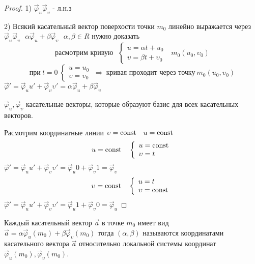 \begin{proof}
  1) $\vec \varphi_u \vec \varphi_{\upsilon}$ - л.н.з

  2) Всякий касательный вектор поверхости точки $m_0$ линейно выражается через
  $\vec \varphi_u \vec \varphi_{\upsilon} ~~~ \alpha \vec \varphi_u +\beta
  \vec \varphi_{\upsilon} ~~~ \alpha, \beta \in R$ нужно доказать
  $$
  \text{расмотрим кривую} ~~~
  \left\{
    \begin{array}{l}
      u = \alpha t + u_0 \\
      \upsilon = \beta t + \upsilon_0
    \end{array}
  \right. ~~~ m_0 (u_0, \upsilon_0)
  $$
  $$
  \text{при} ~ t = 0 ~
  \left\{
    \begin{array}{l}
      u = u_0 \\
      \upsilon = \upsilon_0
    \end{array}
  \right. ~ \Rightarrow ~ \text{кривая проходит через точку} ~
  m_0 (u_0, \upsilon_0)
  $$
  $\vec \varphi' = \vec \varphi_u u' + \vec \varphi_{\upsilon}
  \upsilon' = \alpha \vec \varphi_u + \beta \vec \varphi_{\upsilon}$

  $\vec \varphi_u, \vec \varphi_{\upsilon}$ касательные векторы, которые
  образуют базис для всех касательных векторов.

  Расмотрим координатные линии $\upsilon = \mathrm{const} ~~~ u = \mathrm{const}$
  $$
  u = \mathrm{const} ~~~
  \left\{
    \begin{array}{l}
      u = \mathrm{const} \\
      \upsilon = t
    \end{array}
  \right.
  $$
  $\vec \varphi' = \vec \varphi_u u' + \vec \varphi_{\upsilon}
  \upsilon' = \vec \varphi_u 0 + \vec \varphi_{\upsilon} 1 =
  \vec \varphi_{\upsilon}$
  $$
  \upsilon = \mathrm{const} ~~~
  \left\{
    \begin{array}{l}
      u = t \\
      \upsilon = \mathrm{const}
    \end{array}
  \right.
  $$
  $\vec \varphi' = \vec \varphi_u u' + \vec \varphi_{\upsilon}
  \upsilon' = \vec \varphi_u 1 + \vec \varphi_{\upsilon} 0 = \vec \varphi_u$
\end{proof}

\begin{define}
  Каждый касательный вектор $\vec a$ в точке $m_0$ имеет вид $\vec a =
  \alpha \vec \varphi_u(m_0) + \beta \vec \varphi_{\upsilon}(m_0)$ тогда
  $(\alpha, \beta)$ называются
  координатами касательного вектора $\vec a$ относительно локальной системы
  координат $\vec \varphi_u(m_0), \vec \varphi_{\upsilon}(m_0)$.
\end{define}

